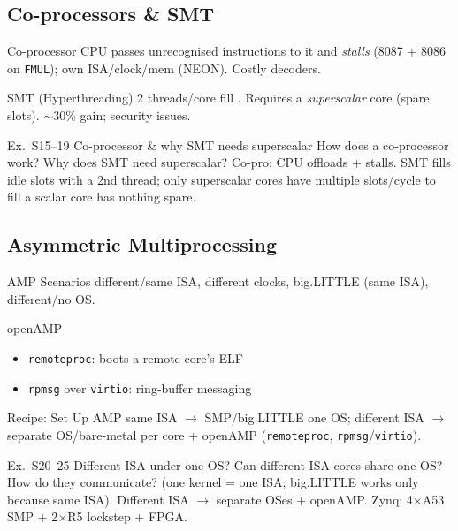 \subsection{Co-processors \& SMT}

\begin{definition}{Co-processor}
    CPU passes unrecognised instructions to it and \emph{stalls} (8087 + 8086 on \texttt{FMUL}); own ISA/clock/mem (NEON). Costly decoders.
\end{definition}

\begin{concept}{SMT (Hyperthreading)}
    2 threads/core fill . Requires a \emph{superscalar} core (spare slots). $\sim$30\% gain; security issues.
\end{concept}

\begin{example2}{Ex.\ S15--19 Co-processor \& why SMT needs superscalar}
    How does a co-processor work? Why does SMT need superscalar?
    \tcblower
    Co-pro: CPU offloads + stalls. SMT fills idle slots with a 2nd thread; only superscalar cores have multiple slots/cycle to fill a scalar core has nothing spare.
\end{example2}

\subsection{Asymmetric Multiprocessing}

\begin{concept}{AMP Scenarios}
    different/same ISA, different clocks, big.LITTLE (same ISA), different/no OS.
\end{concept}

\begin{definition}{openAMP}
    \begin{itemize}
        \item \texttt{remoteproc}: boots a remote core's ELF
        \item \texttt{rpmsg} over \texttt{virtio}: ring-buffer messaging
    \end{itemize}
\end{definition}

\begin{KR}{Recipe: Set Up AMP}
    same ISA $\to$ SMP/big.LITTLE one OS; different ISA $\to$ separate OS/bare-metal per core + openAMP (\texttt{remoteproc}, \texttt{rpmsg}/\texttt{virtio}).
\end{KR}

\begin{example2}{Ex.\ S20--25 Different ISA under one OS?}
    Can different-ISA cores share one OS? How do they communicate?
    \tcblower
     (one kernel = one ISA; big.LITTLE works only because same ISA). Different ISA $\to$ separate OSes + openAMP. Zynq: 4$\times$A53 SMP + 2$\times$R5 lockstep + FPGA.
\end{example2}
